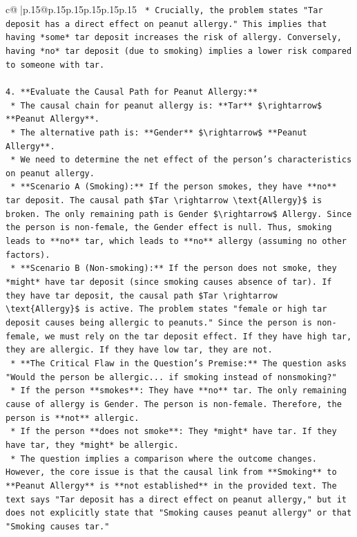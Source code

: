 \documentclass{article}
\begin{document}
{\begin{supertabular}{c@{$\;$}|p{.15\linewidth}@{}p{.15\linewidth}p{.15\linewidth}p{.15\linewidth}p{.15\linewidth}p{.15\linewidth}}
{{{\texttt{    *   Crucially, the problem states "Tar deposit has a direct effect on peanut allergy." This implies that having *some* tar deposit increases the risk of allergy. Conversely, having *no* tar deposit (due to smoking) implies a lower risk compared to someone with tar.} \\
\\ 
\texttt{4.  **Evaluate the Causal Path for Peanut Allergy:**} \\
\texttt{    *   The causal chain for peanut allergy is: **Tar** \$\textbackslash{}rightarrow\$ **Peanut Allergy**.} \\
\texttt{    *   The alternative path is: **Gender** \$\textbackslash{}rightarrow\$ **Peanut Allergy**.} \\
\texttt{    *   We need to determine the net effect of the person's characteristics on peanut allergy.} \\
\texttt{    *   **Scenario A (Smoking):** If the person smokes, they have **no** tar deposit. The causal path \$Tar \textbackslash{}rightarrow \textbackslash{}text\{Allergy\}\$ is broken. The only remaining path is Gender \$\textbackslash{}rightarrow\$ Allergy. Since the person is non{-}female, the Gender effect is null. Thus, smoking leads to **no** tar, which leads to **no** allergy (assuming no other factors).} \\
\texttt{    *   **Scenario B (Non{-}smoking):** If the person does not smoke, they *might* have tar deposit (since smoking causes absence of tar). If they have tar deposit, the causal path \$Tar \textbackslash{}rightarrow \textbackslash{}text\{Allergy\}\$ is active. The problem states "female or high tar deposit causes being allergic to peanuts." Since the person is non{-}female, we must rely on the tar deposit effect. If they have high tar, they are allergic. If they have low tar, they are not.} \\
\texttt{    *   **The Critical Flaw in the Question's Premise:** The question asks "Would the person be allergic... if smoking instead of nonsmoking?"} \\
\texttt{        *   If the person **smokes**: They have **no** tar. The only remaining cause of allergy is Gender. The person is non{-}female. Therefore, the person is **not** allergic.} \\
\texttt{        *   If the person **does not smoke**: They *might* have tar. If they have tar, they *might* be allergic.} \\
\texttt{    *   The question implies a comparison where the outcome changes. However, the core issue is that the causal link from **Smoking** to **Peanut Allergy** is **not established** in the provided text. The text says "Tar deposit has a direct effect on peanut allergy," but it does not explicitly state that "Smoking causes peanut allergy" or that "Smoking causes tar."} \\
}}}
\end{supertabular}}
\end{document}
